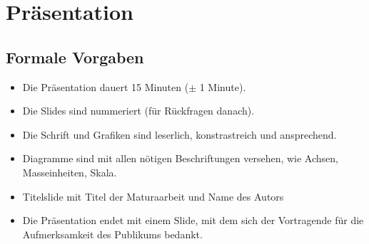 \chapter{Präsentation}\label{sec:praesentation}


\section{Formale Vorgaben}
\begin{itemize}
	\item Die Präsentation dauert 15 Minuten ($\pm$ 1 Minute).
	\item Die Slides sind nummeriert (für Rückfragen danach).
	\item Die Schrift und Grafiken sind leserlich, konstrastreich und
		ansprechend.
	\item Diagramme sind mit allen nötigen Beschriftungen versehen, wie Achsen,
		Masseinheiten, Skala.
	\item Titelslide mit Titel der Maturaarbeit und Name des Autors
	\item Die Präsentation endet mit einem Slide, mit dem sich der Vortragende
		für die Aufmerksamkeit des Publikums bedankt.
\end{itemize}

